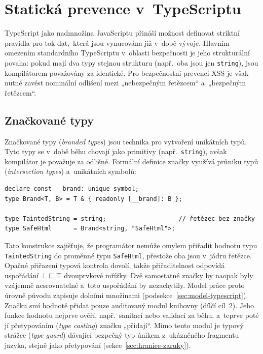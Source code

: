 \section{Statická prevence v~TypeScriptu}

TypeScript jako nadmnožina JavaScriptu přináší možnost definovat striktní pravidla pro tok dat,~která jsou vynucována již v~době vývoje. Hlavním omezením standardního TypeScriptu v~oblasti bezpečnosti je jeho strukturální povaha: pokud mají dva typy stejnou strukturu (např.~oba jsou jen \texttt{string}), jsou kompilátorem považovány za identické. Pro bezpečnostní prevenci XSS je však nutné zavést nominální odlišení mezi „nebezpečným řetězcem“ a~„bezpečným řetězcem“.

\subsection{Značkované typy}
\label{sec:branded}

Značkované typy (\emph{branded types}) jsou technika pro vytvoření unikátních typů. Tyto typy se v~době běhu chovají jako primitivy (např.~\texttt{string}), avšak kompilátor je považuje za odlišné. Formální definice značky využívá průniku typů (\emph{intersection types}) a~unikátních symbolů:

\begin{verbatim}
declare const __brand: unique symbol;
type Brand<T, B> = T & { readonly [__brand]: B };

type TaintedString = string;                    // řetězec bez značky
type SafeHtml      = Brand<string, "SafeHtml">;
\end{verbatim}

Tato konstrukce zajišťuje, že programátor nemůže omylem přiřadit hodnotu typu \texttt{TaintedString} do proměnné typu \texttt{SafeHtml}, přestože oba jsou v~jádru řetězce. Opačné přiřazení typová kontrola dovolí, takže přiřaditelnost odpovídá uspořádání $\bot \sqsubseteq \top$ dvouprvkové mřížky. Dvě samostatné značky by naopak byly vzájemně nesrovnatelné a~toto uspořádání by nezachytily. Model práce proto úrovně původu zapisuje dolními množinami (podsekce~\ref{sec:model-typescript}). Značku smí hodnotě přidat pouze auditovaný modul knihovny (dílčí cíl~2). Jeho funkce hodnotu nejprve ověří, např.~sanitací nebo validací za běhu, a~teprve poté jí přetypováním (\emph{type casting}) značku „přidají“. Mimo tento modul je typový strážce (\emph{type guard}) dávající bezpečný typ únikem z~ukázněného fragmentu jazyka, stejně jako přetypování (sekce~\ref{sec:hranice-zaruky}).

